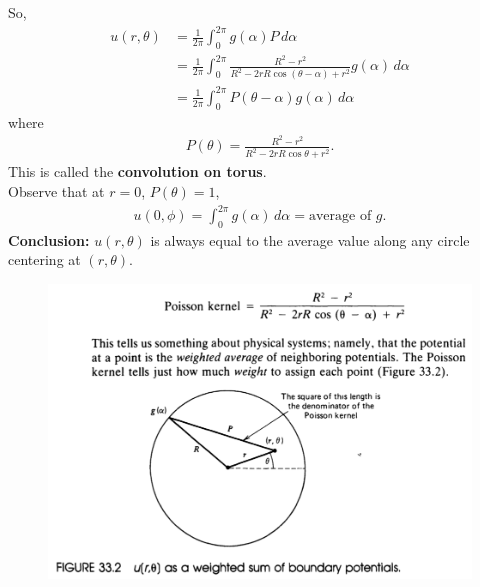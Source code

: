 \documentclass{book}
\theoremstyle{definition}
\newcommand{\f}[2]{\frac{#1}{#2}}
\begin{document}
So,
\begin{align*}
u(r,\theta) &= \f{1}{2\pi}\int^{2\pi}_0 g(\alpha)P\,d\alpha \\
&= \f{1}{2\pi}\int^{2\pi}_0 \f{R^2-r^2}{R^2 - 2rR\cos(\theta-\alpha)+r^2}g(\alpha)\,d\alpha\\
&= \boxed{\f{1}{2\pi}\int^{2\pi}_0 P(\theta-\alpha) g(\alpha) \,d\alpha}
\end{align*}
where 
\begin{align*}
P(\theta) = \f{R^2-r^2}{R^2 - 2rR\cos\theta + r^2}.
\end{align*}
This is called the \textbf{convolution on torus}. \\

Observe that at $r=0$, $P(\theta) = 1$, 
\begin{align*}
u(0,\phi) = \int^{2\pi}_0 g(\alpha)\,d\alpha = \text{average of } g. 
\end{align*}
\textbf{Conclusion:} $u(r,\theta)$ is always equal to the average value along any circle centering at $(r,\theta)$.
\begin{figure}[h!]
	\centering
	\includegraphics[scale=0.75]{poisson.png}
\end{figure}
\end{document}
